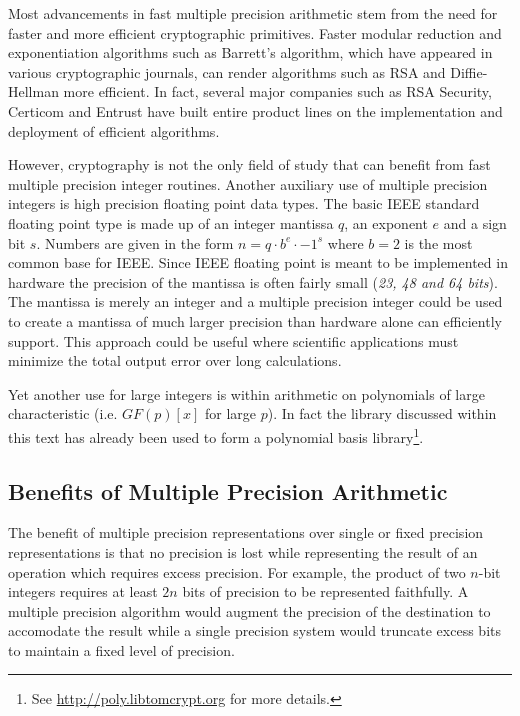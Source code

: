 \documentclass[b5paper]{book}
\begin{document}
Most advancements in fast multiple precision arithmetic stem from the need for faster and more efficient cryptographic 
primitives.  Faster modular reduction and exponentiation algorithms such as Barrett's algorithm, which have appeared in 
various cryptographic journals, can render algorithms such as RSA and Diffie-Hellman more efficient.  In fact, several 
major companies such as RSA Security, Certicom and Entrust have built entire product lines on the implementation and 
deployment of efficient algorithms.

However, cryptography is not the only field of study that can benefit from fast multiple precision integer routines.  
Another auxiliary use of multiple precision integers is high precision floating point data types.  
The basic IEEE \cite{IEEE} standard floating point type is made up of an integer mantissa $q$, an exponent $e$ and a sign bit $s$.  
Numbers are given in the form $n = q \cdot b^e \cdot -1^s$ where $b = 2$ is the most common base for IEEE.  Since IEEE 
floating point is meant to be implemented in hardware the precision of the mantissa is often fairly small 
(\textit{23, 48 and 64 bits}).  The mantissa is merely an integer and a multiple precision integer could be used to create
a mantissa of much larger precision than hardware alone can efficiently support.  This approach could be useful where 
scientific applications must minimize the total output error over long calculations.

Yet another use for large integers is within arithmetic on polynomials of large characteristic (i.e. $GF(p)[x]$ for large $p$).
In fact the library discussed within this text has already been used to form a polynomial basis library\footnote{See \url{http://poly.libtomcrypt.org} for more details.}.

\subsection{Benefits of Multiple Precision Arithmetic}
The benefit of multiple precision representations over single or fixed precision representations is that 
no precision is lost while representing the result of an operation which requires excess precision.  For example, 
the product of two $n$-bit integers requires at least $2n$ bits of precision to be represented faithfully.  A multiple 
precision algorithm would augment the precision of the destination to accomodate the result while a single precision system 
would truncate excess bits to maintain a fixed level of precision.
\end{document}
